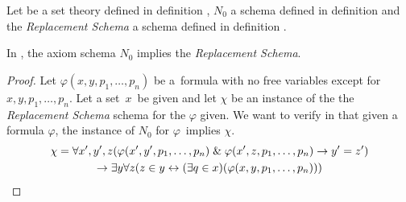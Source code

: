 Let  be a set theory defined in definition , $N_0$ a schema defined in definition  and the \emph{Replacement Schema} a schema defined in definition .
\begin{theorem} 
In , the axiom schema $N_0$ implies the \emph{Replacement Schema}.
\end{theorem}
\begin{proof}
Let $\varphi(x, y, p_1, \ldots, p_n)$ be a~formula with no free variables except for \\
$x, y, p_1, \ldots, p_n$.
Let a set~$x$~be given and let $\chi$ be an instance of the the \emph{Replacement Schema} schema for the $\varphi$ given.
We want to verify in  that given a formula $\varphi$, the instance of $N_0$ for $\varphi$ implies $\chi$.
\begin{equation}
\begin{gathered}
\chi = \forall x', y', z(\varphi(x', y', p_1, \ldots, p_n) \mathrel{\&} \varphi(x', z, p_1, \ldots, p_n) \rightarrow y' = z') \\
\rightarrow \exists y \forall z (z \in y \leftrightarrow (\exists q \in x)(\varphi(x, y, p_1, \ldots, p_n)))
\end{gathered}
\end{equation}


\end{proof}
